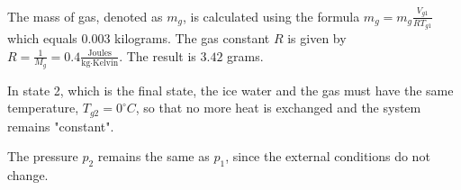 The mass of gas, denoted as \( m_g \), is calculated using the formula \( m_g = m_g \frac{V_{g1}}{R T_{g1}} \) which equals \( 0.003 \) kilograms. The gas constant \( R \) is given by \( R = \frac{1}{M_g} = 0.4 \frac{\text{Joules}}{\text{kg} \cdot \text{Kelvin}} \). The result is \( 3.42 \) grams.

In state 2, which is the final state, the ice water and the gas must have the same temperature, \( T_{g2} = 0^\circ C \), so that no more heat is exchanged and the system remains "constant".

The pressure \( p_2 \) remains the same as \( p_1 \), since the external conditions do not change.